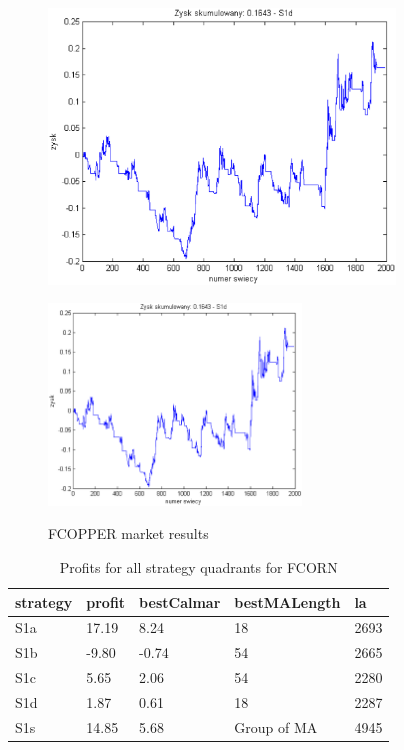 \documentclass{tewiart}
\begin{document}
\begin{figure}[h]
\begin{minipage}{.49\linewidth}
\label{cztero}
\end{minipage}
\begin{minipage}{.49\linewidth}
\centering
\includegraphics[width=0.82\textwidth]{images/fcopperS1d.eps}
\label{mansard}
\end{minipage}
\begin{minipage}{\linewidth}
\centering
\includegraphics[width=0.6\textwidth]{images/fcopperS1s.eps}
\label{mansard}
\end{minipage}
\caption{FCOPPER market results}
\end{figure}
\FloatBarrier
\newpage
\begin{table}[!t]
\caption{Profits for all strategy quadrants for FCORN}
 \begin{center}
 \begin{tabular}{|l|l|l|l|l|}
 \hline \textbf{strategy} & \textbf{profit} & \textbf{bestCalmar} & \textbf{bestMALength} & \textbf{la} \\ \hline
S1a & 17.19 & 8.24 & 18 & 2693\\ \hline
S1b & -9.80 & -0.74 & 54 & 2665\\ \hline
S1c & 5.65 & 2.06 & 54 & 2280\\ \hline
S1d & 1.87 & 0.61 & 18 & 2287\\ \hline
S1s & 14.85 & 5.68 & Group of MA & 4945\\
\hline \end{tabular}
 \end{center}
 \end{table}
\end{document}
